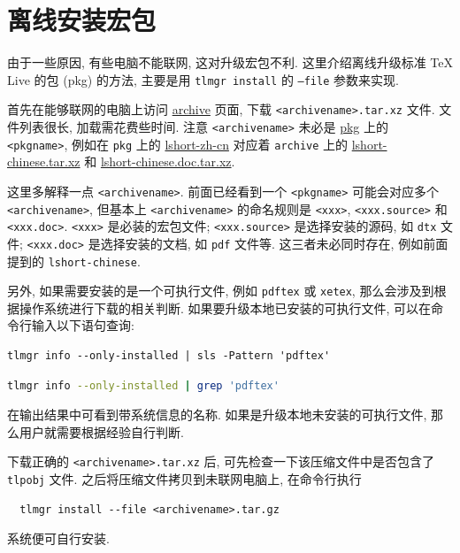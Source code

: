 
\chapter{离线安装宏包}

由于一些原因,
有些电脑不能联网,
这对升级宏包不利.
这里介绍离线升级标准 \TeX{} Live 的包 (pkg) 的方法,
主要是用 \texttt{tlmgr install} 的 \texttt{--file} 参数来实现.

首先在能够联网的电脑上访问
\href{https://ctan.org/tex-archive/systems/texlive/tlnet/archive}{archive}
页面, 下载 \texttt{<archivename>.tar.xz} 文件.
文件列表很长, 加载需花费些时间.
注意 \texttt{<archivename>} 未必是 \href{https://ctan.org/pkg/}{pkg} 上的 \texttt{<pkgname>},
例如在 \texttt{pkg} 上的
\href{https://ctan.org/pkg/lshort-zh-cn}{lshort-zh-cn}
对应着 \texttt{archive} 上的
\href{http://mirrors.ctan.org/systems/texlive/tlnet/archive/lshort-chinese.tar.xz}{lshort-chinese.tar.xz}
和
\href{http://mirrors.ctan.org/systems/texlive/tlnet/archive/lshort-chinese.doc.tar.xz}{lshort-chinese.doc.tar.xz}.

这里多解释一点 \texttt{<archivename>}.
前面已经看到一个 \texttt{<pkgname>} 可能会对应多个 \texttt{<archivename>},
但基本上 \texttt{<archivename>} 的命名规则是 \texttt{<xxx>},
\texttt{<xxx.source>} 和 \texttt{<xxx.doc>}.
\texttt{<xxx>} 是必装的宏包文件;
\texttt{<xxx.source>} 是选择安装的源码, 如 \texttt{dtx} 文件;
\texttt{<xxx.doc>} 是选择安装的文档, 如 \texttt{pdf} 文件等.
这三者未必同时存在, 例如前面提到的 \texttt{lshort-chinese}.

另外, 如果需要安装的是一个可执行文件, 例如 \texttt{pdftex} 或 \texttt{xetex},
那么会涉及到根据操作系统进行下载的相关判断.
如果要升级本地已安装的可执行文件, 可以在命令行输入以下语句查询:
\begin{lstlisting}[title={\small\sffamily Windows 系统}]
  tlmgr info --only-installed | sls -Pattern 'pdftex'
\end{lstlisting}
\begin{lstlisting}[language=bash, title={\small\sffamily Ubuntu 和 Mac 系统}]
  tlmgr info --only-installed | grep 'pdftex'
\end{lstlisting}
在输出结果中可看到带系统信息的名称.
如果是升级本地未安装的可执行文件,
那么用户就需要根据经验自行判断.

下载正确的 \texttt{<archivename>.tar.xz} 后,
可先检查一下该压缩文件中是否包含了 \texttt{tlpobj} 文件.
之后将压缩文件拷贝到未联网电脑上,
在命令行执行
\begin{lstlisting} 
  tlmgr install --file <archivename>.tar.gz 
\end{lstlisting}
系统便可自行安装.